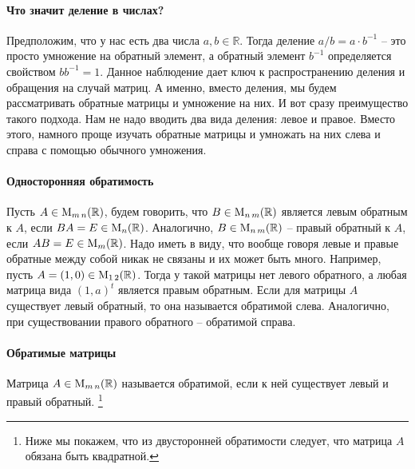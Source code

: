\paragraph{Что значит деление в числах?}

Предположим, что у нас есть два числа $a,b\in\mathbb R$.
Тогда деление $a/b = a \cdot b^{-1}$ -- это просто умножение на обратный элемент, а обратный элемент $b^{-1}$ определяется свойством $b b^{-1} = 1$.
Данное наблюдение дает ключ к распространению деления и обращения на случай матриц.
А именно, вместо деления, мы будем рассматривать обратные матрицы и умножение на них.
И вот сразу преимущество такого подхода.
Нам не надо вводить два вида деления: левое и правое.
Вместо этого, намного проще изучать обратные матрицы и умножать на них слева и справа с помощью обычного умножения.

\paragraph{Односторонняя обратимость}

Пусть $A\in\operatorname{M}_{m\,n}(\mathbb R)$, будем говорить, что $B\in\operatorname{M}_{n\,m}(\mathbb R)$ является левым обратным к $A$, если $BA = E\in\operatorname{M}_{n}(\mathbb R)$.
Аналогично, $B\in\operatorname{M}_{n\,m}(\mathbb R)$ -- правый обратный к $A$, если $AB = E\in\operatorname{M}_{m}(\mathbb R)$.
Надо иметь в виду, что вообще говоря левые и правые обратные между собой никак не связаны и их может быть много.
Например, пусть $A = (1, 0)\in\operatorname{M}_{1\,2}(\mathbb R)$.
Тогда у такой матрицы нет левого обратного, а любая матрица вида $(1, a)^t$ является правым обратным.
Если для матрицы $A$ существует левый обратный, то она называется обратимой слева.
Аналогично, при существовании правого обратного -- обратимой справа.

\paragraph{Обратимые матрицы}

Матрица $A\in\operatorname{M}_{m\,n}(\mathbb R)$ называется обратимой, если к ней существует левый и правый обратный.%
\footnote{Ниже мы покажем, что из двусторонней обратимости следует, что матрица $A$ обязана быть квадратной.}

